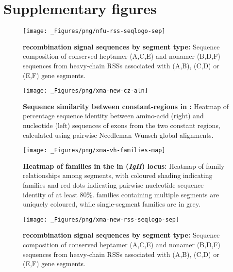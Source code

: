 \chapter{Supplementary figures}
\label{app:figures}


\begin{figure}
	\centering
	\texttt{[image: \_Figures/png/nfu-rss-seqlogo-sep]}
	\caption[\Nfu recombination signal sequences by segment type]{\textbf{\Nfu recombination signal sequences by segment type:} Sequence composition of conserved heptamer (A,C,E) and nonamer (B,D,F) sequences from \Nfu heavy-chain RSSs associated with \vh (A,B), \dh (C,D) or \jh (E,F) gene segments.}
	\label{fig:nfu-rss-seqlogo-sep}
\end{figure}

\begin{figure}
	\centering
	\texttt{[image: \_Figures/png/xma-new-cz-aln]}
	\caption[Sequence similarity between  constant-regions in \Xma]{\textbf{Sequence similarity between  constant-regions in \Xma:} Heatmap of percentage sequence identity between amino-acid (right) and nucleotide (left) sequences of \cz{} exons from the two \Xma {} constant regions, calculated using pairwise Needleman-Wunsch global alignments.} %
	\label{fig:xma-cz-aln}
\end{figure}

	\begin{figure}
	\centering
	\texttt{[image: \_Figures/png/xma-vh-families-map]}
	\caption[Heatmap of \vh families in the in \Xma \textit{IgH} locus]{\textbf{Heatmap of \vh families in the in \Xma (\textit{IgH}) locus:} Heatmap of family relationships among \Xma \vh segments, with coloured shading indicating families and red dots indicating pairwise nucleotide sequence identity of at least 80\%. \vh families containing multiple segments are uniquely coloured, while single-segment families are in grey.}
	\label{fig:xma-vh-families-map}
	\end{figure}

	\begin{figure}
	\centering
	\texttt{[image: \_Figures/png/xma-new-rss-seqlogo-sep]}
	\caption[\Xma recombination signal sequences by segment type]{\textbf{\Xma recombination signal sequences by segment type:} Sequence composition of conserved heptamer (A,C,E) and nonamer (B,D,F) sequences from \Xma heavy-chain RSSs associated with \vh (A,B), \dh (C,D) or \jh (E,F) gene segments.}
	\label{fig:xma-rss-seqlogo-sep}
	\end{figure}